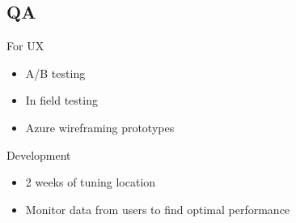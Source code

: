 \subsection*{QA}
For UX
\begin{itemize}
	\item A/B testing
	\item In field testing
	\item Azure wireframing prototypes
\end{itemize}

Development
\begin{itemize}
	\item 2 weeks of tuning location
	\item Monitor data from users to find optimal performance
\end{itemize}
